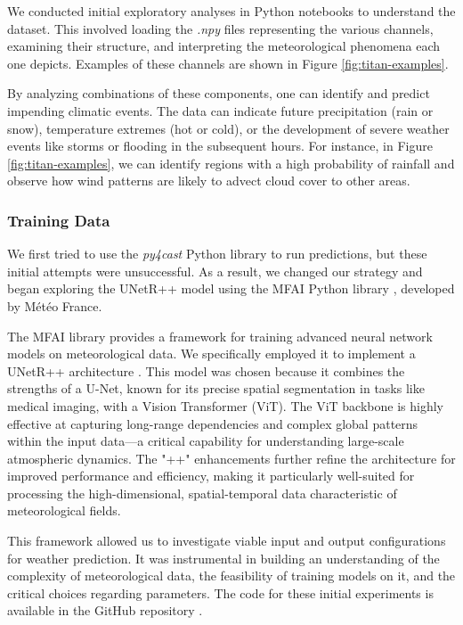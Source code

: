 

We conducted initial exploratory analyses in Python notebooks to understand the dataset. This involved loading the \textit{.npy} files representing the various channels, examining their structure, and interpreting the meteorological phenomena each one depicts. Examples of these channels are shown in Figure \ref{fig:titan-examples}.



By analyzing combinations of these components, one can identify and predict impending climatic events. The data can indicate future precipitation (rain or snow), temperature extremes (hot or cold), or the development of severe weather events like storms or flooding in the subsequent hours. For instance, in Figure \ref{fig:titan-examples}, we can identify regions with a high probability of rainfall and observe how wind patterns are likely to advect cloud cover to other areas.

\subsubsection{Training Data}
We first tried to use the \textit{py4cast} Python library \cite{py4cast} to run predictions, but these initial attempts were unsuccessful. As a result, we changed our strategy and began exploring the UNetR++ model using the MFAI Python library \cite{mfai}, developed by Météo France.

The MFAI library provides a framework for training advanced neural network models on meteorological data. We specifically employed it to implement a UNetR++ architecture \cite{unetrpp}. This model was chosen because it combines the strengths of a U-Net, known for its precise spatial segmentation in tasks like medical imaging, with a Vision Transformer (ViT). The ViT backbone is highly effective at capturing long-range dependencies and complex global patterns within the input data—a critical capability for understanding large-scale atmospheric dynamics. The "++" enhancements further refine the architecture for improved performance and efficiency, making it particularly well-suited for processing the high-dimensional, spatial-temporal data characteristic of meteorological fields.

This framework allowed us to investigate viable input and output configurations for weather prediction. It was instrumental in building an understanding of the complexity of meteorological data, the feasibility of training models on it, and the critical choices regarding parameters. The code for these initial experiments is available in the GitHub repository \cite{mfai-experiments}.

